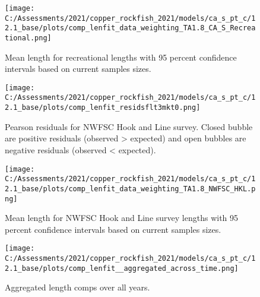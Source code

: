 \documentclass[11pt,
  english,
  a4paper,
]{article}
\begin{document}
\begin{figure}
\centering
\texttt{[image: C:/Assessments/2021/copper\_rockfish\_2021/models/ca\_s\_pt\_c/12.1\_base/plots/comp\_lenfit\_data\_weighting\_TA1.8\_CA\_S\_Recreational.png]}
\caption{Mean length for recreational lengths with 95 percent confidence intervals based on current samples sizes.\label{fig:rec-mean-len-fit}}
\end{figure}

\tagmcend\tagstructend


\begin{figure}
\centering
\texttt{[image: C:/Assessments/2021/copper\_rockfish\_2021/models/ca\_s\_pt\_c/12.1\_base/plots/comp\_lenfit\_residsflt3mkt0.png]}
\caption{Pearson residuals for NWFSC Hook and Line survey. Closed bubble are positive residuals (observed \textgreater{} expected) and open bubbles are negative residuals (observed \textless{} expected).\label{fig:hkl-pearson}}
\end{figure}

\tagmcend\tagstructend


\begin{figure}
\centering
\texttt{[image: C:/Assessments/2021/copper\_rockfish\_2021/models/ca\_s\_pt\_c/12.1\_base/plots/comp\_lenfit\_data\_weighting\_TA1.8\_NWFSC\_HKL.png]}
\caption{Mean length for NWFSC Hook and Line survey lengths with 95 percent confidence intervals based on current samples sizes.\label{fig:hkl-mean-len-fit}}
\end{figure}

\tagmcend\tagstructend


\begin{figure}
\centering
\texttt{[image: C:/Assessments/2021/copper\_rockfish\_2021/models/ca\_s\_pt\_c/12.1\_base/plots/comp\_lenfit\_\_aggregated\_across\_time.png]}
\caption{Aggregated length comps over all years.\label{fig:agg-len-fit}}
\end{figure}
\end{document}
